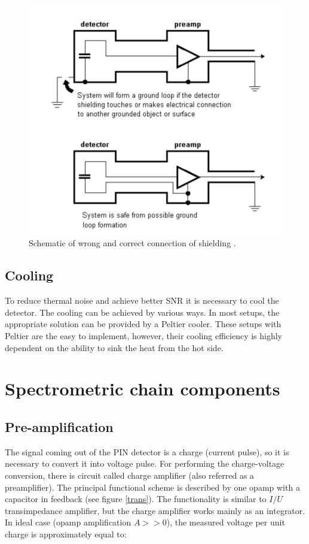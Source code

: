\begin{figure}[H]
 \centering
 \includegraphics[scale=0.35, angle = 0]{./pictures/shielding.png}
 \caption{Schematic of wrong and correct connection of shielding \cite{appCSPnote}.}
 \label{shielding}
 
\end{figure}



\subsection{Cooling}
To reduce thermal noise and achieve better SNR it is necessary to cool the detector. The cooling can be achieved by various ways. In most setups, the appropriate solution can be provided by a Peltier cooler. These setups with Peltier are the easy to implement, however, their cooling efficiency is highly dependent on the ability to sink the heat from the hot side.

\section{Spectrometric chain components}





\subsection{Pre-amplification}
The signal coming out of the PIN detector is a charge (current pulse), so it is necessary to convert it into voltage pulse. For performing the charge-voltage conversion, there is circuit called charge amplifier (also referred as a preamplifier). The principal functional scheme is described by one opamp with a capacitor in feedback (see figure \ref{trans}). The functionality is similar to $I/U$ transimpedance amplifier, but the charge amplifier works mainly as an integrator. In ideal case (opamp amplification $A >> 0$), the measured voltage per unit charge is approximately equal to:

